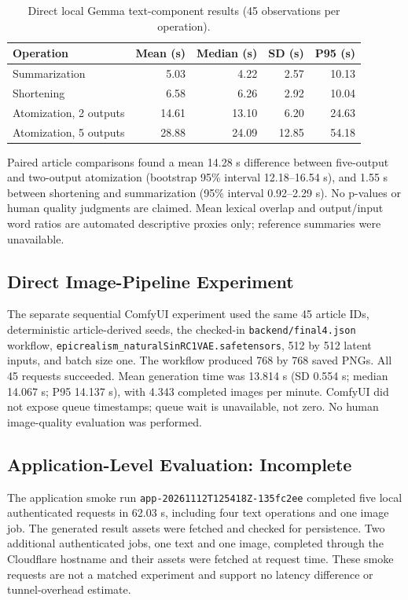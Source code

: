 \documentclass[conference]{IEEEtran}
\begin{document}
\begin{table}[t]
\centering
\caption{Direct local Gemma text-component results (45 observations per operation).}
\label{tab:component-performance}
\begin{tabular}{lrrrr}
\toprule
\textbf{Operation} & \textbf{Mean (s)} & \textbf{Median (s)} & \textbf{SD (s)} & \textbf{P95 (s)} \\
\midrule
Summarization & 5.03 & 4.22 & 2.57 & 10.13 \\
Shortening & 6.58 & 6.26 & 2.92 & 10.04 \\
Atomization, 2 outputs & 14.61 & 13.10 & 6.20 & 24.63 \\
Atomization, 5 outputs & 28.88 & 24.09 & 12.85 & 54.18 \\
\bottomrule
\end{tabular}
\end{table}

Paired article comparisons found a mean 14.28 s difference between five-output and two-output atomization (bootstrap 95\% interval 12.18--16.54 s), and 1.55 s between shortening and summarization (95\% interval 0.92--2.29 s). No p-values or human quality judgments are claimed. Mean lexical overlap and output/input word ratios are automated descriptive proxies only; reference summaries were unavailable.

\subsection{Direct Image-Pipeline Experiment}
The separate sequential ComfyUI experiment used the same 45 article IDs, deterministic article-derived seeds, the checked-in \texttt{backend/final4.json} workflow, \texttt{epicrealism\_naturalSinRC1VAE.safetensors}, 512 by 512 latent inputs, and batch size one. The workflow produced 768 by 768 saved PNGs. All 45 requests succeeded. Mean generation time was 13.814 s (SD 0.554 s; median 14.067 s; P95 14.137 s), with 4.343 completed images per minute. ComfyUI did not expose queue timestamps; queue wait is unavailable, not zero. No human image-quality evaluation was performed.

\subsection{Application-Level Evaluation: Incomplete}
The application smoke run \texttt{app-20261112T125418Z-135fc2ee} completed five local authenticated requests in 62.03 s, including four text operations and one image job. The generated result assets were fetched and checked for persistence. Two additional authenticated jobs, one text and one image, completed through the Cloudflare hostname and their assets were fetched at request time. These smoke requests are not a matched experiment and support no latency difference or tunnel-overhead estimate.
\end{document}
